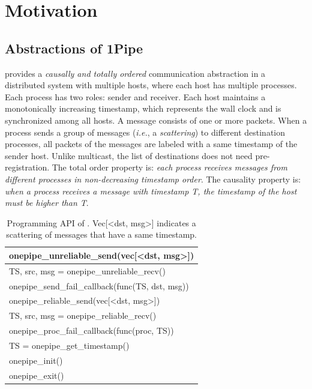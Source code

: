 \section{Motivation}
\label{sec:motivation}

\subsection{Abstractions of 1Pipe}
\label{subsec:abstration}

\sys{} provides a \emph{causally and totally ordered} communication abstraction in a distributed system with multiple hosts, where each host has multiple processes. Each process has two roles: sender and receiver. Each host maintains a monotonically increasing timestamp, which represents the wall clock and is synchronized among all hosts. A message consists of one or more packets. When a process sends a group of messages (\emph{i.e.}, a \emph{scattering}) to different destination processes, all packets of the messages are labeled with a same timestamp of the sender host. Unlike multicast, the list of destinations does not need pre-registration. The total order property is: \emph{each process receives messages from different processes in non-decreasing timestamp order}. The causality property is: \emph{when a process receives a message with timestamp T, the timestamp of the host must be higher than T}.

\begin{table}[htbp]
\centering
\begin{tabular}{l}
	\hline
	onepipe\_unreliable\_send(vec[<dst, msg>]) \\
	\hline
	TS, src, msg = onepipe\_unreliable\_recv() \\
	\hline
	onepipe\_send\_fail\_callback(func(TS, dst, msg)) \\
	\hline
	\hline
	onepipe\_reliable\_send(vec[<dst, msg>]) \\
	\hline
	TS, src, msg = onepipe\_reliable\_recv() \\
	\hline
	onepipe\_proc\_fail\_callback(func(proc, TS)) \\
	\hline
	\hline
	TS = onepipe\_get\_timestamp() \\
	\hline
	onepipe\_init() \\
	\hline
	onepipe\_exit() \\
	\hline
\end{tabular}
\caption{Programming API of \sys{}. Vec[<dst, msg>] indicates a scattering of messages that have a same timestamp.}
\label{tab:abstraction}
\end{table}

